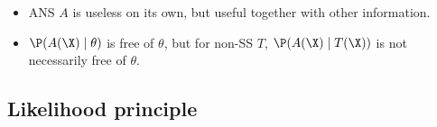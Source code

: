 \documentclass[10pt,a4paper]{article}
\begin{document}
\begin{remark}\label{rmk:SS-MSS-ANS-CS}
	\begin{itemize}
		\item ANS $A$ is useless on its own, but useful together with other information. 
		\item $\P(A(\X)\mid \theta)$ is free of $\theta$, but for non-SS $T$, $\P(A(\X)\mid T(\X))$ is not necessarily free of $\theta$. 
	\end{itemize}
\end{remark}

\subsection{Likelihood principle}\label{sec:prin-data-reduce-lik}








\end{document}
